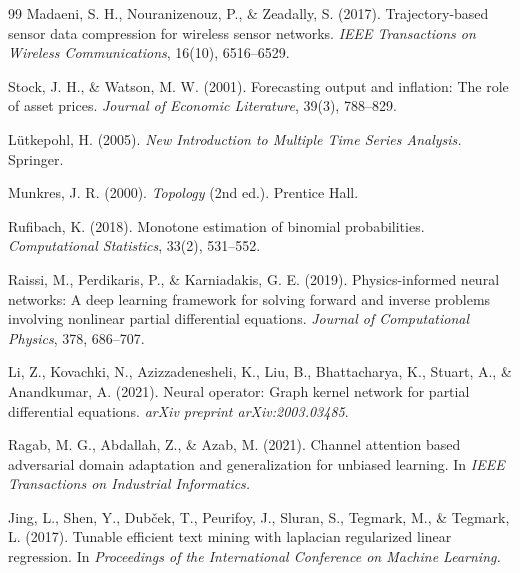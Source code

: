 \documentclass[letterpaper]{article}
\begin{document}
\begin{thebibliography}{99}
 Madaeni, S. H., Nouranizenouz, P., \& Zeadally, S. (2017). Trajectory-based sensor data compression for wireless sensor networks. \textit{IEEE Transactions on Wireless Communications}, 16(10), 6516--6529.

 Stock, J. H., \& Watson, M. W. (2001). Forecasting output and inflation: The role of asset prices. \textit{Journal of Economic Literature}, 39(3), 788--829.

 L{\"u}tkepohl, H. (2005). \textit{New Introduction to Multiple Time Series Analysis.} Springer.

 Munkres, J. R. (2000). \textit{Topology} (2nd ed.). Prentice Hall.

 Rufibach, K. (2018). Monotone estimation of binomial probabilities. \textit{Computational Statistics}, 33(2), 531--552.

 Raissi, M., Perdikaris, P., \& Karniadakis, G. E. (2019). Physics-informed neural networks: A deep learning framework for solving forward and inverse problems involving nonlinear partial differential equations. \textit{Journal of Computational Physics}, 378, 686--707.

 Li, Z., Kovachki, N., Azizzadenesheli, K., Liu, B., Bhattacharya, K., Stuart, A., \& Anandkumar, A. (2021). Neural operator: Graph kernel network for partial differential equations. \textit{arXiv preprint arXiv:2003.03485}.

 Ragab, M. G., Abdallah, Z., \& Azab, M. (2021). Channel attention based adversarial domain adaptation and generalization for unbiased learning. In \textit{IEEE Transactions on Industrial Informatics.}

 Jing, L., Shen, Y., Dub{\v c}ek, T., Peurifoy, J., Sluran, S., Tegmark, M., \& Tegmark, L. (2017). Tunable efficient text mining with laplacian regularized linear regression. In \textit{Proceedings of the International Conference on Machine Learning.}

\end{thebibliography}
\end{document}
